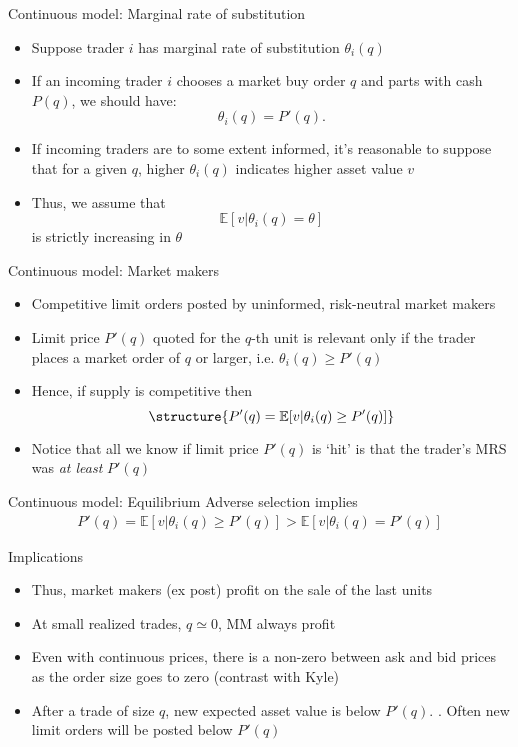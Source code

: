 \documentclass[english,10pt]{beamer}
\begin{document}
\begin{frame}{Continuous model: Marginal rate of substitution}
	\begin{itemize}
		\item Suppose trader $i$ has  marginal rate of substitution $\theta_i(q)$
		\item If an incoming trader $i$ chooses a market buy order $q$ and parts with cash $P(q)$, we should have: \[\theta_i(q) = P'(q).\]
		\item If incoming traders are to some extent informed, it's reasonable to suppose that for a given $q$, higher $\theta_i(q)$ indicates higher asset value $v$
		\item Thus, we assume that 
		\[
		\mathbb{E}[v|\theta_i(q) = \theta]
		\]
		is strictly increasing in $\theta$
	\end{itemize}
\end{frame}


\begin{frame}{Continuous model: Market makers}
	\begin{itemize}	
		\item Competitive limit orders posted by uninformed, risk-neutral market makers
		\item Limit price $P'(q)$ quoted for the $q$-th unit is relevant only if the trader places a market order of $q$ or larger, i.e. $\theta_i(q) \geq P'(q)$
		\item Hence, if supply is competitive then
		\[
		\structure{P'(q) = \mathbb{E}[v|\theta_i(q) \geq P'(q)]}
		\]
		\item Notice that all we know if limit price $P'(q)$ is `hit' is that the trader's MRS was \textit{at least} $P'(q)$
	\end{itemize}
\end{frame}


\begin{frame}{Continuous model: Equilibrium}
	Adverse selection implies
	\begin{align}
	P'(q) = \mathbb{E}[v|\theta_i(q) \geq P'(q)] > \mathbb{E}[v|\theta_i(q) = P'(q)]
	\end{align}
	\begin{block}{Implications}
		\begin{itemize}
			\item Thus, market makers (ex post) profit on the sale of the last units
			\item At small realized trades, $q \simeq 0$, MM always profit
			\item Even with continuous prices, there is a non-zero  between ask and bid prices as the order size goes to zero (contrast with Kyle)
			\item After a trade of size $q$, new expected asset value is below $P'(q)$. \pause {}. Often new limit orders will be posted below $P'(q)$
		\end{itemize}
	\end{block}
\end{frame}
\end{document}
